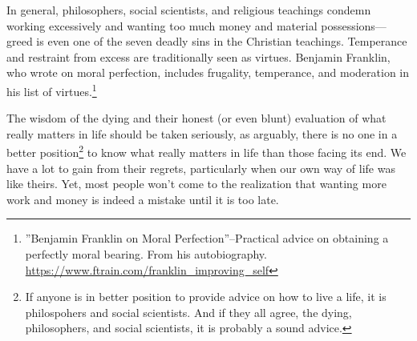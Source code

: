 \documentclass[10pt, letterpaper]{article}
\begin{document}
\begin{spacing}{1.8}
In general, philosophers, social scientists, 
 and religious teachings condemn working excessively and wanting too much money and material possessions---greed is even one of the seven deadly sins in the Christian teachings. 
Temperance and restraint from excess are traditionally seen as virtues. Benjamin Franklin, who wrote on moral perfection, includes frugality, temperance, and moderation in his list of virtues.\footnote{''Benjamin Franklin on Moral Perfection''--Practical advice on obtaining a perfectly moral bearing. From his autobiography. \url{https://www.ftrain.com/franklin_improving_self}}

The wisdom of the dying and their honest (or even  blunt) evaluation of what really matters in life should be taken seriously, as arguably, there is no one in a better position\footnote{If anyone is in better position to provide advice on how to live a life, it is philospohers and social scientists. And if they all agree, the dying, philosophers, and social scientists, it is probably a sound advice.} to know what really matters in life than those facing its end. We have a lot to gain from their regrets, particularly when our own way of life was like theirs. Yet, most people won't come to the realization that wanting more work and money is indeed a mistake until it is too late.


\end{spacing}
\end{document}
